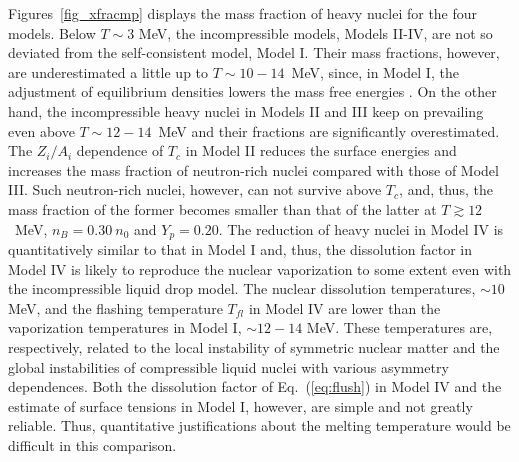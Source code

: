 \documentclass[preprint]{revtex4}
\begin{document}
{{{%
 Figures~\ref{fig_xfracmp} displays the mass fraction of heavy nuclei for the four models. Below $T\sim 3$ MeV,  the incompressible models, Models II-IV,  
are not so deviated from the self-consistent model, Model I.
Their mass fractions, however, are underestimated a little up to $T \sim 10-14$~MeV,
since, in Model I, the adjustment of equilibrium densities lowers the mass free energies \cite{furusawa17c}. 
On the other hand, the incompressible  heavy nuclei in Models II and III keep on prevailing even above $T\sim 12-14$~MeV and their fractions are significantly overestimated.
The $Z_i/A_i$ dependence of $T_c$ in  Model II  reduces the surface energies  and increases the mass fraction of neutron-rich nuclei  compared with those of Model III. Such  neutron-rich nuclei, however,  can not survive above $T_c$, and, thus, the mass fraction of the former becomes smaller than that of the latter at $T\gtrsim12$~MeV, $n_B= 0.30 \ n_0$ and $Y_p=0.20$.
The reduction of heavy nuclei in Model IV is quantitatively  similar to that in Model I 
and, thus, the dissolution factor in Model IV is likely to reproduce the nuclear vaporization to some extent even with the incompressible liquid drop model. 
The nuclear dissolution temperatures, $\sim10$ MeV, and the flashing temperature $T_{fl}$  in Model IV are lower than the vaporization  temperatures in Model I, $\sim12-14$ MeV.
These temperatures are, respectively, related to the local instability of symmetric nuclear matter and the global instabilities of compressible liquid nuclei with various asymmetry dependences.
Both the dissolution factor of Eq.~(\ref{eq:flush}) in Model IV and the estimate of surface tensions in Model I, however, are simple and not greatly reliable. Thus, quantitative justifications about the melting temperature would be difficult in this comparison.}

}}
\end{document}
